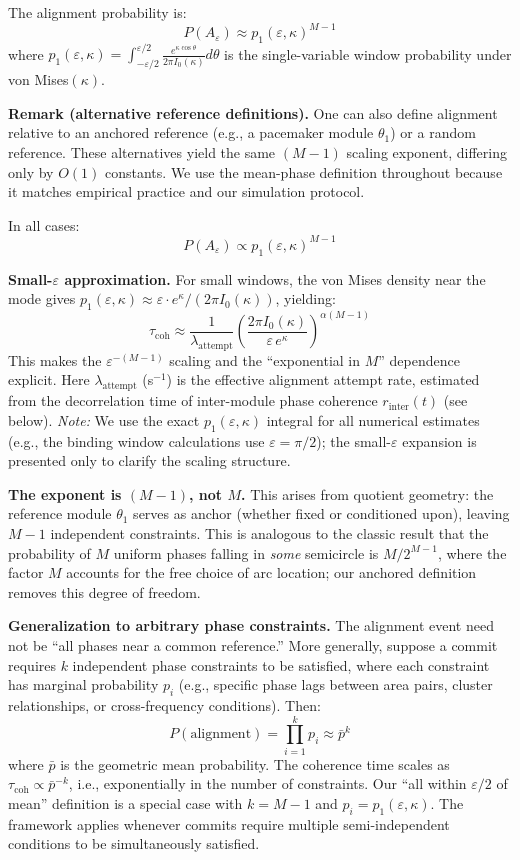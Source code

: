 \documentclass[12pt]{article}
\begin{document}
The alignment probability is:
\[
P(A_\varepsilon) \approx p_1(\varepsilon, \kappa)^{M-1}
\]
where $p_1(\varepsilon, \kappa) = \int_{-\varepsilon/2}^{\varepsilon/2} \frac{e^{\kappa\cos\theta}}{2\pi I_0(\kappa)} d\theta$ is the single-variable window probability under von Mises$(\kappa)$.

\textbf{Remark (alternative reference definitions).} One can also define alignment relative to an anchored reference (e.g., a pacemaker module $\theta_1$) or a random reference. These alternatives yield the same $(M-1)$ scaling exponent, differing only by $O(1)$ constants. We use the mean-phase definition throughout because it matches empirical practice and our simulation protocol.

In all cases:
\begin{equation}\label{eq:coh-mises}
P(A_\varepsilon) \propto p_1(\varepsilon, \kappa)^{M-1}
\end{equation}

\textbf{Small-$\varepsilon$ approximation.} For small windows, the von Mises density near the mode gives $p_1(\varepsilon, \kappa) \approx \varepsilon \cdot e^\kappa / (2\pi I_0(\kappa))$, yielding:
\[
\tau_{\mathrm{coh}} \approx \frac{1}{\lambda_{\mathrm{attempt}}} \left( \frac{2\pi I_0(\kappa)}{\varepsilon \, e^\kappa} \right)^{\alpha(M-1)}
\]
This makes the $\varepsilon^{-(M-1)}$ scaling and the ``exponential in $M$'' dependence explicit. Here $\lambda_{\mathrm{attempt}}$ (s$^{-1}$) is the effective alignment attempt rate, estimated from the decorrelation time of inter-module phase coherence $r_{\mathrm{inter}}(t)$ (see below). \emph{Note:} We use the exact $p_1(\varepsilon, \kappa)$ integral for all numerical estimates (e.g., the binding window calculations use $\varepsilon = \pi/2$); the small-$\varepsilon$ expansion is presented only to clarify the scaling structure.

\textbf{The exponent is $(M-1)$, not $M$.} This arises from quotient geometry: the reference module $\theta_1$ serves as anchor (whether fixed or conditioned upon), leaving $M-1$ independent constraints. This is analogous to the classic result that the probability of $M$ uniform phases falling in \emph{some} semicircle is $M/2^{M-1}$, where the factor $M$ accounts for the free choice of arc location; our anchored definition removes this degree of freedom.

\textbf{Generalization to arbitrary phase constraints.} The alignment event need not be ``all phases near a common reference.'' More generally, suppose a commit requires $k$ independent phase constraints to be satisfied, where each constraint has marginal probability $p_i$ (e.g., specific phase lags between area pairs, cluster relationships, or cross-frequency conditions). Then:
\[
P(\text{alignment}) = \prod_{i=1}^k p_i \approx \bar{p}^k
\]
where $\bar{p}$ is the geometric mean probability. The coherence time scales as $\tau_{\mathrm{coh}} \propto \bar{p}^{-k}$, i.e., exponentially in the number of constraints. Our ``all within $\varepsilon/2$ of mean'' definition is a special case with $k = M-1$ and $p_i = p_1(\varepsilon, \kappa)$. The framework applies whenever commits require multiple semi-independent conditions to be simultaneously satisfied.
\end{document}
